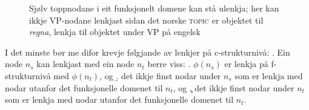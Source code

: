 \documentclass[12pt,a4paper,oneside,draft]{report}
\newcommand{\F}[2]{\textsc{#1}\ensuremath{_{#2}}}
\newcommand{\TOPIC}{\F{topic}{}}
\newcommand{\proj}[2]{\begin{tabular}{c}\footnotesize{#1}\\\normalsize{#2}\end{tabular}}
\newcommand{\ua}{\ensuremath{\uparrow}}
\newcommand{\da}{\ensuremath{\downarrow}}
\begin{document}
  \begin{figure}[htp]
  \centering
     \caption{Sjølv toppnodane i eit funksjonelt domene kan stå
     ulenkja; her kan ikkje VP-nodane lenkjast sidan det norske
     \TOPIC{} er objektet til \emph{regna}, lenkja til objektet under
     VP på engelsk}
     \label{fig:ikkje-c-lenkje-toppnode}
    \end{figure}

I det minste bør me difor krevje følgjande av lenkjer på c\hyp{}strukturnivå:
\ex.\label{krav:c-tentativt} Ein node $n_s$ kan lenkjast med ein node $n_t$ berre viss:
\a. $\phi(n_s)$ er lenkja på f\hyp{}strukturnivå med $\phi(n_t)$, og
\b. det ikkje finst nodar under $n_s$ som er lenkja med nodar utanfor det funksjonelle domenet
    til $n_t$, og 
\c. det ikkje finst nodar under $n_t$ som er lenkja med nodar utanfor det funksjonelle domenet
    til $n_t$.
\end{document}

